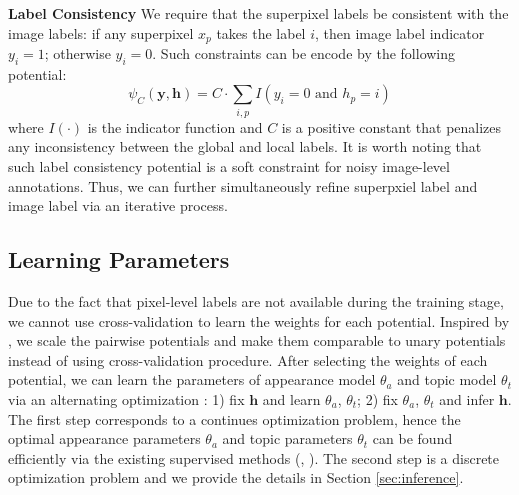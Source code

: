 \textbf{Label Consistency}
We require that the superpixel labels be consistent with the image labels: if any superpixel $x_p$ takes the label $i$, then image label indicator $y_i=1$; otherwise $y_i=0$. Such constraints can be encode by the following potential:
\begin{equation}
    \psi_{C}(\boldsymbol{y},\boldsymbol{h}) =
    C \cdot \sum_{i,p} I(y_i=0 \mbox{ and } h_p=i)
\end{equation}
where $I(\cdot)$ is the indicator function and $C$ is a positive constant that penalizes any inconsistency between the global and local labels. It is worth noting that such label consistency potential is a soft constraint for noisy image-level annotations. Thus, we can further simultaneously refine superpxiel label and image label via an iterative process.

\subsection{Learning Parameters}
Due to the fact that pixel-level labels are not available during the training stage, we cannot use cross-validation \cite{kohli2009robust} to learn the weights for each potential. Inspired by \cite{vezhnevets2011weakly}, we scale the pairwise potentials and make them comparable to unary potentials instead of using cross-validation procedure.
After selecting the weights of each potential, we can learn the parameters of appearance model $\theta_a$ and topic model $\theta_t$ via an alternating optimization \cite{vezhnevets2011weakly}: 1) fix $\boldsymbol{h}$ and learn $\theta_a$, $\theta_t$; 2) fix $\theta_a$, $\theta_t$ and infer $\boldsymbol{h}$. The first step corresponds to a continues optimization problem, hence the optimal appearance parameters $\theta_a$ and topic parameters $\theta_t$ can be found efficiently via the existing supervised methods (\eg, \cite{shotton2006textonboost}). The second step is a discrete optimization problem and we provide the details in Section \ref{sec:inference}.

